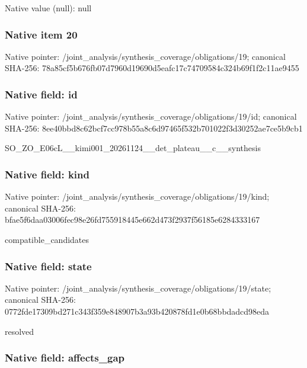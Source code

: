 \documentclass[10pt,a4paper]{article}
\begin{document}
Native value (null): null



\subsubsection{Native item 20}


Native pointer: /joint\_analysis/synthesi\allowbreak{}s\_coverage/obligations/1\allowbreak{}9; canonical SHA-256: 78a85cf5b676fb07d7960d19\allowbreak{}690d5eafc17c74709584c324\allowbreak{}b69f1f2c11ae9455



\subsubsection{Native field: id}


Native pointer: /joint\_analysis/synthesi\allowbreak{}s\_coverage/obligations/1\allowbreak{}9/id; canonical SHA-256: 8ee40bbd8c62bcf7cc978b55\allowbreak{}a8c6d97465f532b701022f3d\allowbreak{}30252ae7ce5b9cb1


SO\_ZO\_E06cL\_\_kimi001\_202\allowbreak{}61124\_\_det\_plateau\_\_c\_\_s\allowbreak{}ynthesis


\subsubsection{Native field: kind}


Native pointer: /joint\_analysis/synthesi\allowbreak{}s\_coverage/obligations/1\allowbreak{}9/kind; canonical SHA-256: bfae5f6daa03006fec98e26f\allowbreak{}d755918445e662d473f2937f\allowbreak{}56185e6284333167


compatible\_candidates


\subsubsection{Native field: state}


Native pointer: /joint\_analysis/synthesi\allowbreak{}s\_coverage/obligations/1\allowbreak{}9/state; canonical SHA-256: 0772fde17309bd271c343f35\allowbreak{}9e848907b3a93b420878fd1e\allowbreak{}0b68bbdadcd98eda


resolved


\subsubsection{Native field: affects\_gap}
\end{document}
